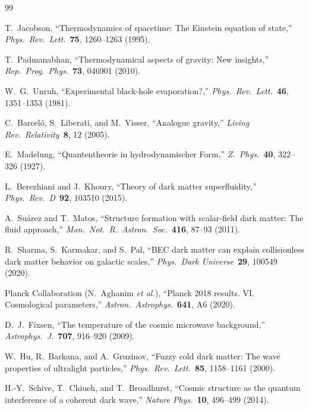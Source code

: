 \documentclass[11pt,a4paper]{article}
\theoremstyle{definition}
\theoremstyle{remark}
\begin{document}
\begin{thebibliography}{99}

T.~Jacobson, ``Thermodynamics of spacetime: The Einstein equation of state,'' \emph{Phys.\ Rev.\ Lett.}\ \textbf{75}, 1260--1263 (1995).

T.~Padmanabhan, ``Thermodynamical aspects of gravity: New insights,'' \emph{Rep.\ Prog.\ Phys.}\ \textbf{73}, 046901 (2010).

W.~G.~Unruh, ``Experimental black-hole evaporation?,'' \emph{Phys.\ Rev.\ Lett.}\ \textbf{46}, 1351--1353 (1981).

C.~Barceló, S.~Liberati, and M.~Visser, ``Analogue gravity,'' \emph{Living Rev.\ Relativity}\ \textbf{8}, 12 (2005).

E.~Madelung, ``Quantentheorie in hydrodynamischer Form,'' \emph{Z.\ Phys.}\ \textbf{40}, 322--326 (1927).

L.~Berezhiani and J.~Khoury, ``Theory of dark matter superfluidity,'' \emph{Phys.\ Rev.\ D}\ \textbf{92}, 103510 (2015).

A.~Suárez and T.~Matos, ``Structure formation with scalar-field dark matter: The fluid approach,'' \emph{Mon.\ Not.\ R.\ Astron.\ Soc.}\ \textbf{416}, 87--93 (2011).

R.~Sharma, S.~Karmakar, and S.~Pal, ``BEC dark matter can explain collisionless dark matter behavior on galactic scales,'' \emph{Phys.\ Dark Universe}\ \textbf{29}, 100549 (2020).

Planck Collaboration (N.~Aghanim \emph{et al.}), ``Planck 2018 results. VI. Cosmological parameters,'' \emph{Astron.\ Astrophys.}\ \textbf{641}, A6 (2020).

D.~J.~Fixsen, ``The temperature of the cosmic microwave background,'' \emph{Astrophys.\ J.}\ \textbf{707}, 916--920 (2009).

W.~Hu, R.~Barkana, and A.~Gruzinov, ``Fuzzy cold dark matter: The wave properties of ultralight particles,'' \emph{Phys.\ Rev.\ Lett.}\ \textbf{85}, 1158--1161 (2000).

H.-Y.~Schive, T.~Chiueh, and T.~Broadhurst, ``Cosmic structure as the quantum interference of a coherent dark wave,'' \emph{Nature Phys.}\ \textbf{10}, 496--499 (2014).


\end{thebibliography}
\end{document}
